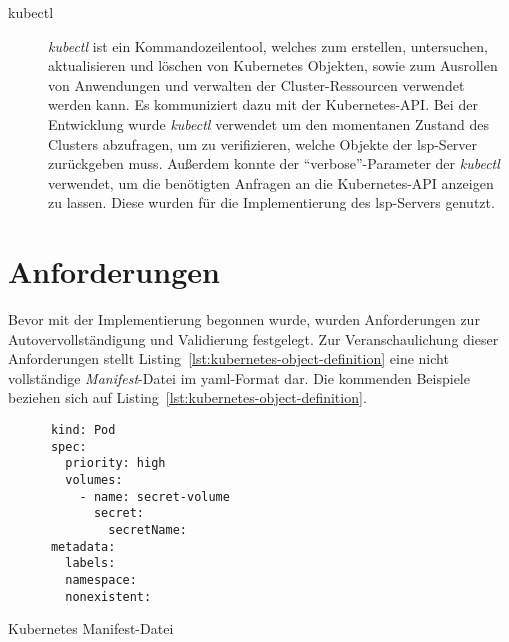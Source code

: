 \begin{description}
      \item[kubectl]
            \textit{kubectl} ist ein Kommandozeilentool, welches zum erstellen, untersuchen, aktualisieren und löschen von Kubernetes Objekten, sowie zum Ausrollen
            von Anwendungen und verwalten der Cluster-Ressourcen verwendet werden kann. Es kommuniziert dazu mit der Kubernetes-API.\@
            Bei der Entwicklung wurde \textit{kubectl} verwendet um den momentanen Zustand des Clusters abzufragen,
            um zu verifizieren, welche Objekte der \ac{lsp}-Server zurückgeben muss.
            Außerdem konnte der ``verbose''-Parameter der \textit{kubectl} verwendet, um die benötigten Anfragen an die Kubernetes-API anzeigen zu lassen.
            Diese wurden für die Implementierung des \ac{lsp}-Servers genutzt.
\end{description}

\section{Anforderungen}\label{sec:requirements}

Bevor mit der Implementierung begonnen wurde, wurden Anforderungen zur Autovervollständigung und Validierung festgelegt. Zur Veranschaulichung
dieser Anforderungen stellt Listing~\ref{lst:kubernetes-object-definition} eine nicht vollständige \textit{Manifest}-Datei im \ac{yaml}-Format dar.
Die kommenden Beispiele beziehen sich auf Listing~\ref{lst:kubernetes-object-definition}.

\begin{listing}[htp]
      \begin{verbatim}
      kind: Pod
      spec: 
        priority: high
        volumes: 
          - name: secret-volume
            secret: 
              secretName: 
      metadata: 
        labels: 
        namespace:
        nonexistent:
      \end{verbatim}
      \caption{Kubernetes Manifest-Datei}
      \label{lst:kubernetes-object-definition}
\end{listing}


